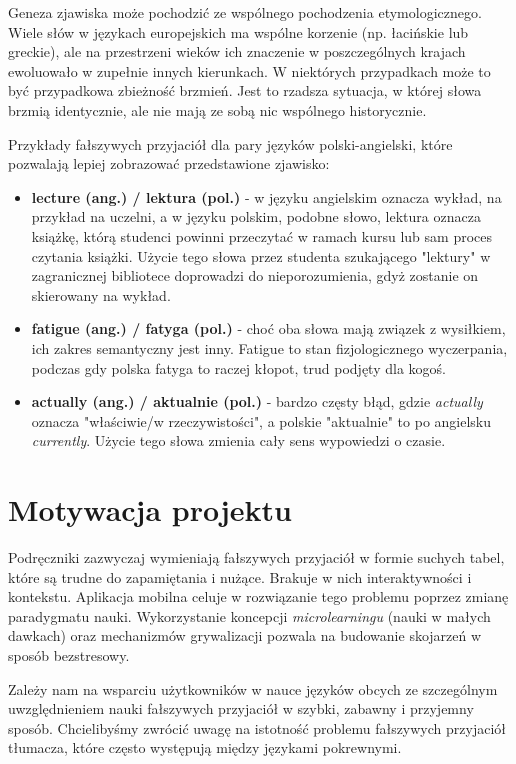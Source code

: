 \documentclass[polish]{aghengthesis}
\begin{document}
Geneza zjawiska może pochodzić ze wspólnego pochodzenia etymologicznego. Wiele słów
w językach europejskich ma wspólne korzenie (np. łacińskie lub greckie), ale na
przestrzeni wieków ich znaczenie w poszczególnych krajach ewoluowało w zupełnie
innych kierunkach. W niektórych przypadkach może to być przypadkowa zbieżność brzmień.
Jest to rzadsza sytuacja, w której słowa brzmią identycznie, ale nie mają ze sobą nic
wspólnego historycznie.

Przykłady fałszywych przyjaciół dla pary języków polski-angielski, które pozwalają
lepiej zobrazować przedstawione zjawisko:
\begin{itemize}
    \item \textbf{lecture (ang.) / lektura (pol.)} - w języku angielskim oznacza
    wykład, na przykład na uczelni, a w języku polskim, podobne słowo, lektura
    oznacza książkę, którą studenci powinni przeczytać w ramach kursu lub sam proces
    czytania książki. Użycie tego słowa przez studenta szukającego "lektury"
    w zagranicznej bibliotece doprowadzi do nieporozumienia, gdyż zostanie on
    skierowany na wykład.
    \item \textbf{fatigue (ang.) / fatyga (pol.)} - choć oba słowa mają związek
    z wysiłkiem, ich zakres semantyczny jest inny. Fatigue to stan fizjologicznego
    wyczerpania, podczas gdy polska fatyga to raczej kłopot, trud podjęty dla kogoś.
    \item \textbf{actually (ang.) / aktualnie (pol.)} - bardzo częsty błąd, gdzie
    \textit{actually} oznacza "właściwie/w rzeczywistości", a polskie "aktualnie"
    to po angielsku \textit{currently}. Użycie tego słowa zmienia cały sens wypowiedzi
    o czasie.
\end{itemize}

\section{Motywacja projektu}

Podręczniki zazwyczaj wymieniają fałszywych przyjaciół w formie suchych tabel,
które są trudne do zapamiętania i nużące. Brakuje w nich interaktywności
i kontekstu. Aplikacja mobilna celuje w rozwiązanie tego problemu poprzez zmianę
paradygmatu nauki. Wykorzystanie koncepcji \textit{microlearningu} (nauki
w małych dawkach) oraz mechanizmów grywalizacji pozwala na budowanie skojarzeń
w sposób bezstresowy.

Zależy nam na wsparciu użytkowników w nauce języków obcych ze szczególnym
uwzględnieniem nauki fałszywych przyjaciół w szybki, zabawny i przyjemny sposób.
Chcielibyśmy zwrócić uwagę na istotność problemu fałszywych przyjaciół tłumacza,
które często występują między językami pokrewnymi.
\end{document}
